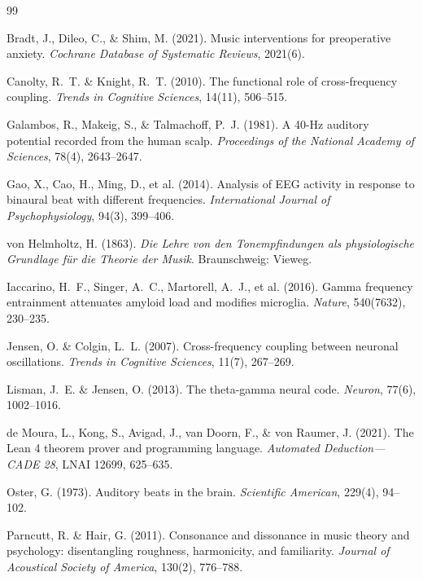 \documentclass[11pt,a4paper]{article}
\begin{document}
\begin{thebibliography}{99}

Bradt, J., Dileo, C., \& Shim, M. (2021).
Music interventions for preoperative anxiety.
\textit{Cochrane Database of Systematic Reviews}, 2021(6).

Canolty, R.~T. \& Knight, R.~T. (2010).
The functional role of cross-frequency coupling.
\textit{Trends in Cognitive Sciences}, 14(11), 506--515.

Galambos, R., Makeig, S., \& Talmachoff, P.~J. (1981).
A 40-Hz auditory potential recorded from the human scalp.
\textit{Proceedings of the National Academy of Sciences}, 78(4), 2643--2647.

Gao, X., Cao, H., Ming, D., et al. (2014).
Analysis of EEG activity in response to binaural beat with different frequencies.
\textit{International Journal of Psychophysiology}, 94(3), 399--406.

von Helmholtz, H. (1863).
\textit{Die Lehre von den Tonempfindungen als physiologische Grundlage
f\"ur die Theorie der Musik}. Braunschweig: Vieweg.

Iaccarino, H.~F., Singer, A.~C., Martorell, A.~J., et al. (2016).
Gamma frequency entrainment attenuates amyloid load and modifies
microglia. \textit{Nature}, 540(7632), 230--235.

Jensen, O. \& Colgin, L.~L. (2007).
Cross-frequency coupling between neuronal oscillations.
\textit{Trends in Cognitive Sciences}, 11(7), 267--269.

Lisman, J.~E. \& Jensen, O. (2013).
The theta-gamma neural code.
\textit{Neuron}, 77(6), 1002--1016.

de Moura, L., Kong, S., Avigad, J., van Doorn, F., \& von Raumer, J. (2021).
The Lean 4 theorem prover and programming language.
\textit{Automated Deduction---CADE 28}, LNAI 12699, 625--635.

Oster, G. (1973).
Auditory beats in the brain.
\textit{Scientific American}, 229(4), 94--102.

Parncutt, R. \& Hair, G. (2011).
Consonance and dissonance in music theory and psychology: disentangling
roughness, harmonicity, and familiarity.
\textit{Journal of Acoustical Society of America}, 130(2), 776--788.


\end{thebibliography}
\end{document}

